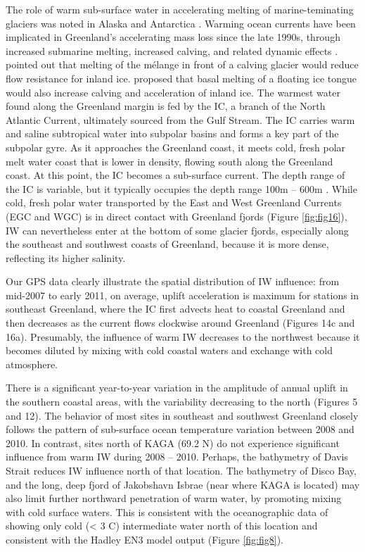 The role of warm sub-surface water in accelerating
melting of marine-teminating glaciers was
noted in Alaska \cite[]{motyka2003submarine} and Antarctica
\cite[]{payne2004recent,shepherd2004warm}. Warming
ocean currents have been implicated in Greenland’s
accelerating mass loss since the late 1990s, through
increased submarine melting, increased calving, and
related dynamic effects \cite[]{myers2007irminger,holland2008acceleration,straneo2010rapid,straneo2012characteristics,seale2011ocean,joughin2012ice}. \cite{amundson2010ice} pointed out that melting of the mélange in front of
a calving glacier would reduce flow resistance for
inland ice. \cite{motyka2011submarine} proposed that basal
melting of a floating ice tongue would also increase
calving and acceleration of inland ice. The warmest
water found along the Greenland margin is fed by
the IC, a branch of the North Atlantic Current,
ultimately sourced from the Gulf Stream. The IC
carries warm and saline subtropical water into
subpolar basins and forms a key part of the
subpolar gyre. As it approaches the Greenland
coast, it meets cold, fresh polar melt water coast
that is lower in density, flowing south along the
Greenland coast. At this point, the IC becomes a
sub-surface current. The depth range of the IC is
variable, but it typically occupies the depth range
100m – 600m \cite[e.g.,][]{myers2007irminger,holland2008acceleration,straneo2012characteristics}. While cold, fresh
polar water transported by the East and West
Greenland Currents (EGC and WGC) is in direct
contact with Greenland fjords (Figure \ref{fig:fig16}), IW can
nevertheless enter at the bottom of some glacier
fjords, especially along the southeast and southwest
coasts of Greenland, because it is more dense,
reflecting its higher salinity.

Our GPS data clearly illustrate the spatial
distribution of IW influence: from mid-2007 to early
2011, on average, uplift acceleration is maximum
for stations in southeast Greenland, where the IC
first advects heat to coastal Greenland and then
decreases as the current flows clockwise around
Greenland (Figures 14c and 16a). Presumably, the
influence of warm IW decreases to the northwest
because it becomes diluted by mixing with cold
coastal waters and exchange with cold atmosphere.

There is a significant year-to-year variation in
the amplitude of annual uplift in the southern coastal
areas, with the variability decreasing to the north
(Figures 5 and 12). The behavior of most sites in
southeast and southwest Greenland closely follows
the pattern of sub-surface ocean temperature variation
between 2008 and 2010. In contrast, sites north of KAGA (69.2 \textordmasculine N) do not experience significant influence from warm IW during 2008 – 2010.
Perhaps, the bathymetry of Davis Strait reduces IW
influence north of that location. The bathymetry of
Disco Bay, and the long, deep fjord of Jakobshavn
Isbrae (near where KAGA is located) may also
limit further northward penetration of warm water,
by promoting mixing with cold surface waters. This
is consistent with the oceanographic data of \cite{straneo2012characteristics} showing only cold (< 3 \textordmasculine C) intermediate
water north of this location and consistent with the
Hadley EN3 model output (Figure \ref{fig:fig8}).

